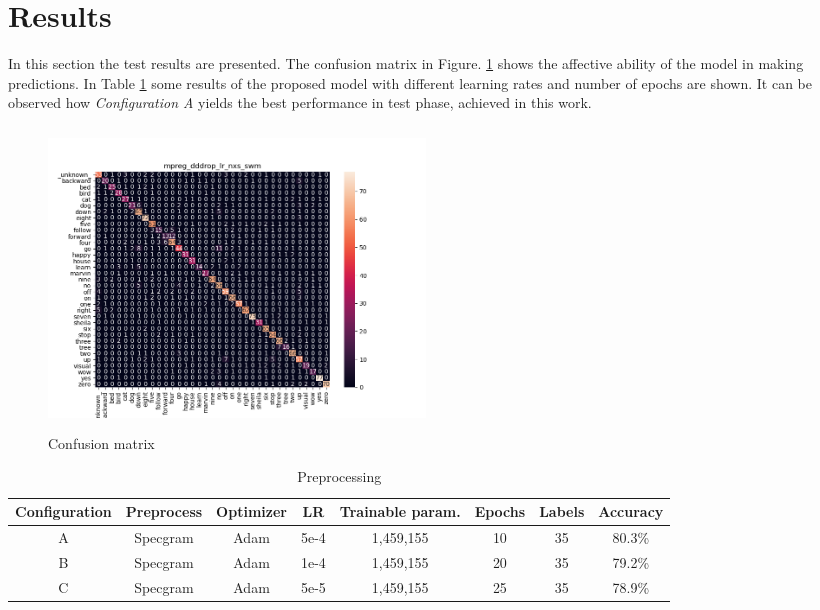 
\section{Results}
\label{sec:results}
\noindent In this section the test results are presented. The confusion matrix in Figure. \ref{fig:conf_matrix_cnn} shows the affective ability of the model in making predictions. In Table \ref{table:Preprocessing} some results of the proposed model with different learning rates and number of epochs are shown. It can be observed how {\it{Configuration A}} yields the best performance in test phase, achieved in this work.

\begin{figure}[h]
			\centering
	    	\includegraphics[width=10cm, height=8cm]{conf_matrix_cnn_dii_cm}
	    	\caption{Confusion matrix}
	    	\label{fig:conf_matrix_cnn}
\end{figure} 

\begin{table}[ht]
	\centering
	\begin{tabular}{|c c c c c c c c|}
		\hline
		Configuration & Preprocess & Optimizer & LR & Trainable param. & Epochs  & Labels & Accuracy \\
		\hline
		A &Specgram & Adam & 5e-4 & 1,459,155 & 10 & 35 & 80.3\% \\
		B &Specgram&Adam&1e-4&1,459,155&20&35&79.2\% \\
		C &Specgram&Adam&5e-5&1,459,155&25&35&78.9\% \\
		\hline
	\end{tabular}
	\caption{Preprocessing}
	\label{table:Preprocessing}
\end{table}